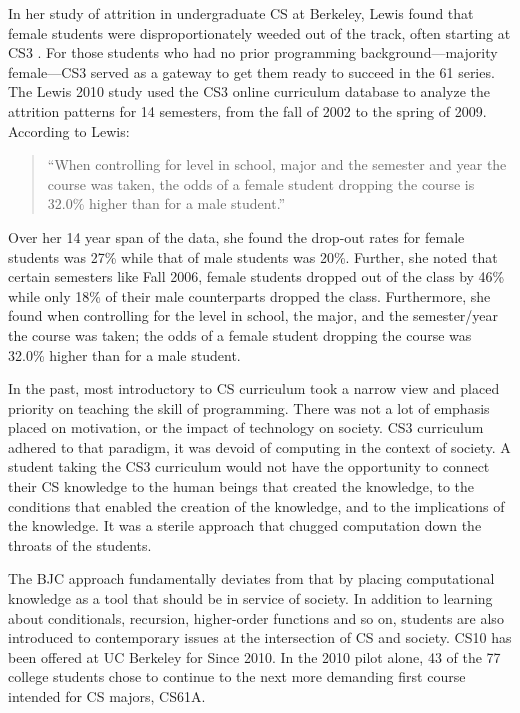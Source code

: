 \documentclass[oneside,titlepage,numbers=noenddot,headinclude,%
               footinclude=true,cleardoublepage=empty,abstractoff,BCOR=2mm,%
               paper=a4,fontsize=11pt,ngerman,american]{scrreprt}
\numberwithin{theorem}{chapter}
\numberwithin{definition}{chapter}
\numberwithin{algorithm}{chapter}
\numberwithin{figure}{chapter}
\numberwithin{table}{chapter}
\numberwithin{equation}{chapter}
\begin{document}
In her study of attrition in undergraduate CS at Berkeley, Lewis found that female students were disproportionately weeded out of the track, often starting at CS3 \cite{Lewis:EECS-2010-132}. For those students who had no prior programming background---majority female---CS3 served as a gateway to get them ready to succeed in the 61 series. The Lewis 2010 study used the CS3 online curriculum database to analyze the attrition patterns for 14 semesters, from the fall of 2002 to the spring of 2009. According to Lewis:
\begin{quote}
``When controlling for level in school, major and the semester and year the course was taken, the odds of a female student dropping the course is 32.0\% higher than for a male student.''\cite{Lewis:EECS-2010-132}
\end{quote}
Over her 14 year span of the data, she found the drop-out rates for female students was 27\% while that of male students was 20\%. Further, she noted that certain semesters like Fall 2006, female students dropped out of the class by 46\% while only 18\% of their male counterparts dropped the class. Furthermore, she found when controlling for the level in school, the major, and the semester/year the course was taken; the odds of a female student dropping the course was 32.0\% higher than for a male student.

In the past, most introductory to CS curriculum took a narrow view and placed priority on teaching the skill of programming. There was not a lot of emphasis placed on motivation, or the impact of technology on society. CS3 curriculum adhered to that paradigm, it was devoid of computing in the context of society. A student taking the CS3 curriculum would not have the opportunity to connect their CS knowledge to the human beings that created the knowledge, to the conditions that enabled the creation of the knowledge, and to the implications of the knowledge. It was a sterile approach that chugged computation down the throats of the students. 

The BJC approach fundamentally deviates from that by placing computational knowledge as a tool that should be in service of society. In addition to learning about conditionals, recursion, higher-order functions and so on, students are also introduced to contemporary issues at the intersection of CS and society. CS10 has been offered at UC Berkeley for Since 2010. In the 2010 pilot alone, 43 of the 77 college students chose to continue to the next more demanding first course intended for CS majors, CS61A.
\end{document}
